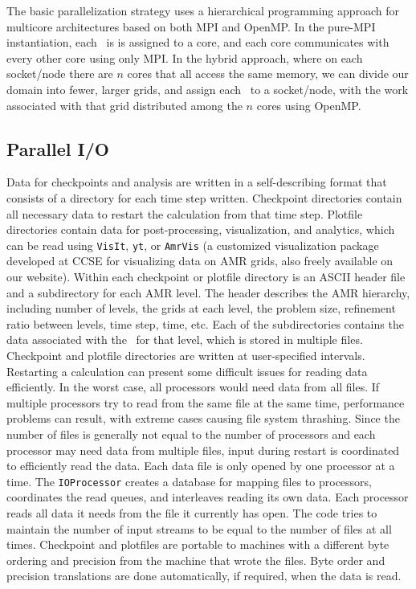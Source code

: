 The basic parallelization strategy uses a hierarchical programming approach for 
multicore architectures based on both MPI and OpenMP.  In the pure-MPI instantiation, 
each \Fab\ is is assigned to a core, and each core communicates 
with every other core using only MPI.  In the hybrid approach, where on each socket/node 
there are $n$ cores that all access the same memory, we can divide our domain into
fewer, larger grids, and assign each \Fab\ to a socket/node, 
with the work associated with that grid distributed among the $n$ 
cores using OpenMP.

\subsection{Parallel I/O}

Data for checkpoints and analysis are written in a self-describing format that consists 
of a directory for each time step written. Checkpoint directories contain all necessary 
data to restart the calculation from that time step. Plotfile directories contain data 
for post-processing, visualization, and analytics, which can be read using {\tt VisIt}, 
{\tt yt}, or {\tt AmrVis} (a customized visualization package developed at CCSE for 
visualizing data on AMR grids, also freely available on our website).  Within each 
checkpoint or plotfile directory is an ASCII header file and a
subdirectory for each AMR level.  The header describes the AMR hierarchy, including 
number of levels, the grids at each level, the problem size, refinement ratio 
between levels, time step, time, etc.  Each of the subdirectories contains the data 
associated with the \MultiFab\ for that level, which is stored in multiple files.
Checkpoint and plotfile directories are written at user-specified intervals.\\

Restarting a calculation can present some difficult issues for reading data efficiently. 
In the worst case, all processors would need data from all files. If multiple processors 
try to read from the same file at the same time, performance problems can result, with 
extreme cases causing file system thrashing.  Since the number of files is generally not 
equal to the number of processors and each processor may need data from multiple files, 
input during restart is coordinated to efficiently read the data. Each data file is only 
opened by one processor at a time. The {\tt IOProcessor} creates a database for mapping files 
to processors, coordinates the read queues, and interleaves reading its own data.  Each 
processor reads all data it needs from the file it currently has open.  The code tries to 
maintain the number of input streams to be equal to the number of files at all times. 
Checkpoint and plotfiles are portable to machines with a different byte ordering and 
precision from the machine that wrote the files.  Byte order and precision translations 
are done automatically, if required, when the data is read.

